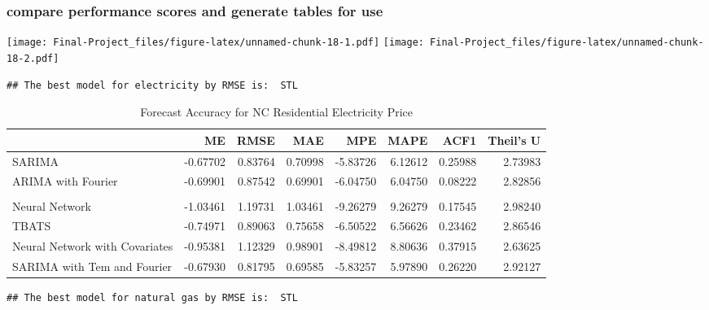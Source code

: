 \documentclass[
]{article}
\begin{document}
\hypertarget{compare-performance-scores-and-generate-tables-for-use}{%
\subsubsection{compare performance scores and generate tables for
use}\label{compare-performance-scores-and-generate-tables-for-use}}

\texttt{[image: Final-Project\_files/figure-latex/unnamed-chunk-18-1.pdf]}
\texttt{[image: Final-Project\_files/figure-latex/unnamed-chunk-18-2.pdf]}

\begin{verbatim}
## The best model for electricity by RMSE is:  STL
\end{verbatim}

\begin{table}[!h]

\caption{\label{tab:unnamed-chunk-18}Forecast Accuracy for NC Residential Electricity Price}
\centering
\begin{tabular}[t]{l|r|r|r|r|r|r|r}
\hline
  & ME & RMSE & MAE & MPE & MAPE & ACF1 & Theil's U\\
\hline
SARIMA & -0.67702 & 0.83764 & 0.70998 & -5.83726 & 6.12612 & 0.25988 & 2.73983\\
\hline
ARIMA with Fourier & -0.69901 & 0.87542 & 0.69901 & -6.04750 & 6.04750 & 0.08222 & 2.82856\\
\hline
\cellcolor{red}{STL} & \cellcolor{red}{-0.58551} & \cellcolor{red}{0.76708} & \cellcolor{red}{0.63447} & \cellcolor{red}{-5.01390} & \cellcolor{red}{5.43949} & \cellcolor{red}{0.25835} & \cellcolor{red}{2.36056}\\
\hline
Neural Network & -1.03461 & 1.19731 & 1.03461 & -9.26279 & 9.26279 & 0.17545 & 2.98240\\
\hline
TBATS & -0.74971 & 0.89063 & 0.75658 & -6.50522 & 6.56626 & 0.23462 & 2.86546\\
\hline
Neural Network with Covariates & -0.95381 & 1.12329 & 0.98901 & -8.49812 & 8.80636 & 0.37915 & 2.63625\\
\hline
SARIMA with Tem and Fourier & -0.67930 & 0.81795 & 0.69585 & -5.83257 & 5.97890 & 0.26220 & 2.92127\\
\hline
\end{tabular}
\end{table}

\begin{verbatim}
## The best model for natural gas by RMSE is:  STL
\end{verbatim}
\end{document}
